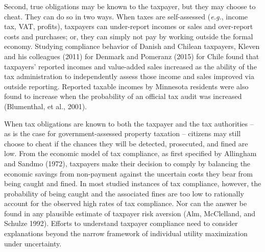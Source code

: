 \documentclass[12pt,titlepage]{article}
\begin{document}
Second, true obligations may be known to the taxpayer, but they may
choose to cheat.  They can do so in two ways.  When taxes are
self-assessed (\textit{e.g.}, income tax, VAT, profits), taxpayers can
under-report incomes or sales and over-report costs and purchases; 
or, they can simply not pay by working outside the formal economy. 
Studying compliance behavior of Danish and Chilean taxpayers, 
Kleven and his colleagues (2011) for Denmark and Pomeranz (2015)
for Chile found that taxpayers’ reported incomes and value-added
sales increased as the ability of the tax administration to
independently assess those income and sales improved via outside
reporting.   Reported taxable incomes by Minnesota residents were
also found to increase when the probability of an official tax audit
was increased (Blumenthal, et al., 2001).  

When tax obligations are known to both the taxpayer and the tax
authorities – as is the case for government-assessed property
taxation – citizens may still choose to cheat if the chances they
will be detected, prosecuted, and fined are low.  From the economic
model of tax compliance, as first specified by Allingham and Sandmo (1972),
taxpayers make their decision to comply by balancing the economic
savings from non-payment against the uncertain costs they bear from
being caught and fined.  In most studied instances of tax compliance,
however, the probability of being caught and the associated fines are
too low to rationally account for the observed high rates of tax
compliance.    Nor can the answer be found in any plausible estimate
of taxpayer risk aversion (Alm, McClelland, and Schulze 1992). 
Efforts to understand taxpayer compliance need to consider explanations
beyond the narrow framework of individual utility maximization under uncertainty.  
\end{document}
